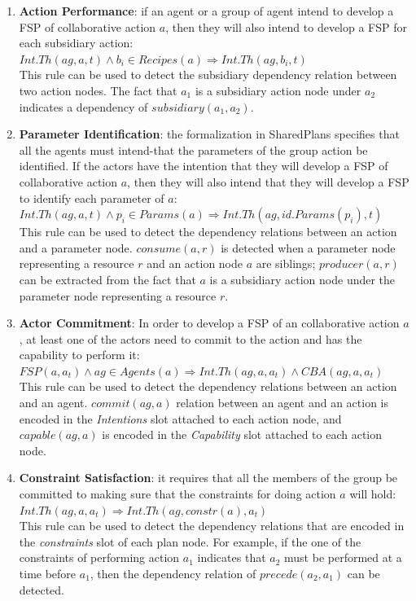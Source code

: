 \begin{enumerate}
	\item \textbf{Action Performance}: if an agent or a group of agent intend to develop a FSP of collaborative action $a$, then they will also intend to develop a FSP for each subsidiary action:\\
	$Int.Th(ag, a, t) \land b_i\in Recipes(a) \Rightarrow Int.Th(ag, b_i, t)$\\
	This rule can be used to detect the subsidiary dependency relation between two action nodes. The fact that $a_1$ is a subsidiary action node under $a_2$ indicates a dependency of $subsidiary(a_1, a_2)$. 
	
	\item \textbf{Parameter Identification}: the formalization in SharedPlans specifies that all the agents must intend-that the parameters of the group action be identified. If the actors have the intention that they will develop a FSP of collaborative action $a$, then they will also intend that they will develop a FSP to identify each parameter of $a$:\\
	$Int.Th(ag, a, t) \land p_i\in Params(a) \Rightarrow Int.Th(ag, id.Params(p_i), t)$\\
	This rule can be used to detect the dependency relations between an action and a parameter node. $consume(a, r)$ is detected when a parameter node representing a resource $r$ and an action node $a$ are siblings; $producer(a, r)$ can be extracted from the fact that $a$ is a subsidiary action node under the parameter node representing a resource $r$. 
	
	\item \textbf{Actor Commitment}: In order to develop a FSP of an collaborative action $a$, at least one of the actors need to commit to the action and has the capability to perform it:\\
	$FSP(a, a_t) \land ag\in Agents(a) \Rightarrow Int.Th(ag, a, a_t) \land CBA(ag, a, a_t)$\\
	This rule can be used to detect the dependency relations between an action and an agent. $commit(ag,a)$ relation between an agent and an action is encoded in the \emph{Intentions} slot attached to each action node, and $capable(ag, a)$ is encoded in the \emph{Capability} slot attached to each action node.
	
	\item \textbf{Constraint Satisfaction}: it requires that all the members of the group be committed to making sure that the constraints for doing action $a$ will hold:\\
	$Int.Th(ag, a, a_t) \Rightarrow Int.Th(ag, constr(a), a_t)$\\
	This rule can be used to detect the dependency relations that are encoded in the \emph{constraints} slot of each plan node. For example, if the one of the constraints of performing action $a_1$ indicates that $a_2$ must be performed at a time before $a_1$, then the dependency relation of $precede(a_2, a_1)$ can be detected.
\end{enumerate}

